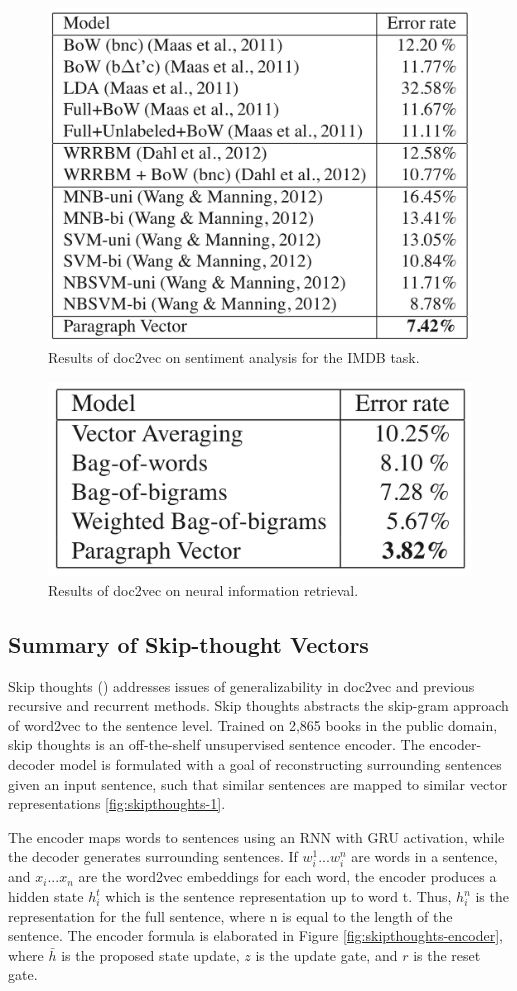 \begin{figure}
\centering
  \includegraphics[width=.7\linewidth]{files/doc2vec-5.png}
  \caption{Results of doc2vec on sentiment analysis for the IMDB task.}
  \label{fig:doc2vec-res2}
\end{figure}

\begin{figure}
\centering
  \includegraphics[width=.5\linewidth]{files/doc2vec-6.png}
  \caption{Results of doc2vec on neural information retrieval.}
  \label{fig:doc2vec-res3}
\end{figure}


\subsection{Summary of Skip-thought Vectors}

Skip thoughts (\cite{DBLP:journals/corr/KirosZSZTUF15}) addresses issues of generalizability in doc2vec and previous recursive and recurrent methods. Skip thoughts abstracts the skip-gram approach of word2vec to the sentence level. Trained on 2,865 books in the public domain, skip thoughts is an off-the-shelf unsupervised sentence encoder. The encoder-decoder model is formulated with a goal of reconstructing surrounding sentences given an input sentence, such that similar sentences are mapped to similar vector representations \ref{fig:skipthoughts-1}. 

The encoder maps words to sentences using an RNN with GRU activation, while the decoder generates surrounding sentences. If $w_i^1...w_i^n$ are words in a sentence, and $x_i...x_n$ are the word2vec embeddings for each word, the encoder produces a hidden state $h_i^t$ which is the sentence representation up to word t. Thus, $h_i^n$ is the representation for the full sentence, where n is equal to the length of the sentence. The encoder formula is elaborated in Figure \ref{fig:skipthoughts-encoder}, where $\bar h$ is the proposed state update, $z$ is the update gate, and $r$ is the reset gate. 

